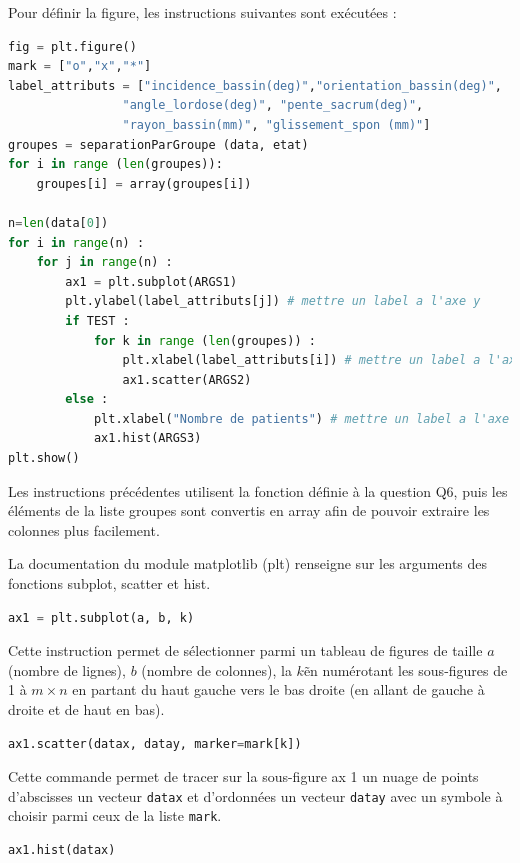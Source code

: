 \ifprof
\else
Pour définir la figure, les instructions suivantes sont exécutées :


\begin{lstlisting}[language=Python]
fig = plt.figure()
mark = ["o","x","*"]
label_attributs = ["incidence_bassin(deg)","orientation_bassin(deg)",
				"angle_lordose(deg)", "pente_sacrum(deg)",
				"rayon_bassin(mm)", "glissement_spon (mm)"]
groupes = separationParGroupe (data, etat)
for i in range (len(groupes)):
    groupes[i] = array(groupes[i])

n=len(data[0])
for i in range(n) :
    for j in range(n) :
        ax1 = plt.subplot(ARGS1)
        plt.ylabel(label_attributs[j]) # mettre un label a l'axe y
        if TEST :
            for k in range (len(groupes)) :
                plt.xlabel(label_attributs[i]) # mettre un label a l'axe x
                ax1.scatter(ARGS2)
        else :
            plt.xlabel("Nombre de patients") # mettre un label a l'axe x
            ax1.hist(ARGS3)
plt.show()
\end{lstlisting}

Les instructions précédentes utilisent la fonction  définie à la question Q6,
puis les éléments de la liste groupes sont convertis en array afin de pouvoir extraire les colonnes
plus facilement.

La documentation du module matplotlib (plt) renseigne sur les arguments des fonctions subplot,
scatter et hist.



\begin{lstlisting}[language=Python]
ax1 = plt.subplot(a, b, k)
\end{lstlisting}

Cette instruction permet de sélectionner parmi un tableau de figures de taille $a$ (nombre de lignes),
$b$ (nombre de colonnes), la $k$\ieme \~ en numérotant les sous-figures de 1 à $m \times n$ en partant du haut gauche
vers le bas droite (en allant de gauche à droite et de haut en bas).

\begin{lstlisting}[language=Python]
ax1.scatter(datax, datay, marker=mark[k])
\end{lstlisting}

Cette commande permet de tracer sur la sous-figure ax 1 un nuage de points d’abscisses un vecteur
\texttt{datax} et d’ordonnées un vecteur \texttt{datay} avec un symbole à choisir parmi ceux de la liste \texttt{mark}.

\begin{lstlisting}[language=Python]
ax1.hist(datax)
\end{lstlisting}

